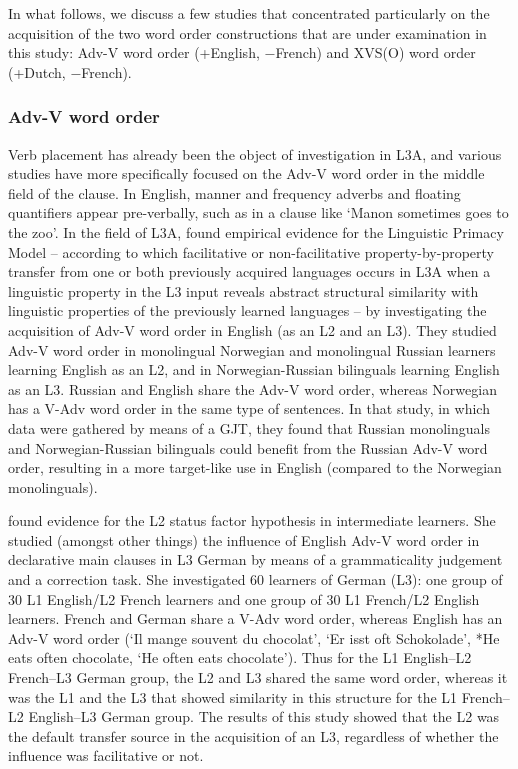 \documentclass[output=paper,modfonts,nonflat, newtxmath]{langsci/langscibook}
\begin{document}
In what follows, we discuss a few studies that concentrated particularly on the acquisition of the two word order constructions that are under examination in this study: Adv-V word order (+English, $-$French) and XVS(O) word order (+Dutch, $-$French).

\subsubsection{{Adv-V} {word} {order}}%
\label{sec:stadt:2.2.1}

Verb placement has already been the object of investigation in L3A, and various studies have more specifically focused on the Adv-V word order in the middle field of the clause. In English, manner and frequency adverbs and floating quantifiers appear pre-verbally, such as in a clause like ‘Manon sometimes goes to the zoo’. In the field of L3A, \citet{WestergaardEtAl2016} found empirical evidence for the Linguistic Primacy Model – according to which facilitative or non-facilitative property-by-property transfer from one or both previously acquired languages occurs in L3A when a linguistic property in the L3 input reveals abstract structural similarity with linguistic properties of the previously learned languages – by investigating the acquisition of Adv-V word order in English (as an L2 and an L3). They studied Adv-V word order in monolingual Norwegian and monolingual Russian learners learning English as an L2, and in Norwegian-Russian bilinguals learning English as an L3. Russian and English share the Adv-V word order, whereas Norwegian has a V-Adv word order in the same type of sentences. In that study, in which data were gathered by means of a GJT, they found that Russian monolinguals and Norwegian-Russian bilinguals could benefit from the Russian Adv-V word order, resulting in a more target-like use in English (compared to the Norwegian monolinguals).

  \citet{Falk2010} found evidence for the L2 status factor hypothesis in intermediate learners. She studied (amongst other things) the influence of English Adv-V word order in declarative main clauses in L3 German by means of a grammaticality judgement and a correction task. She investigated 60 learners of German (L3): one group of 30 L1 English/L2 French learners and one group of 30 L1 French/L2 English learners. French and German share a V-Adv word order, whereas English has an Adv-V word order (‘Il mange souvent du chocolat’, ‘Er isst oft Schokolade’, *He eats often chocolate, ‘He often eats chocolate’). Thus for the L1 English–L2 French–L3 German group, the L2 and L3 shared the same word order, whereas it was the L1 and the L3 that showed similarity in this structure for the L1 French–L2 English–L3 German group. The results of this study showed that the L2 was the default transfer source in the acquisition of an L3, regardless of whether the influence was facilitative or not.
\end{document}
